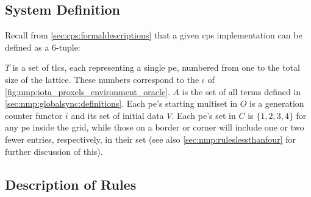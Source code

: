 \subsection{System Definition}
Recall from \cref{sec:cps:formaldescriptions} that a given \gls{cps} implementation can be defined as a 6-tuple:


\(T\) is a set of \glspl{tlc}, each representing a single \gls{pe}, numbered from one to the total size of the lattice.  These numbers correspond to the \(\iota\) of \cref{fig:nmp:iota_proxels_environment_oracle}.  \(A\) is the set of all terms defined in \cref{sec:nmp:globalsync:definitions}.  Each \gls{pe}'s starting multiset in \(O\) is a generation counter functor \(i\) and its set of initial data \(V\).  Each \gls{pe}'s set in \(C\) is \(\{1, 2, 3, 4\}\) for any \gls{pe} inside the grid, while those on a border or corner will include one or two fewer entries, respectively, in their set (see also \cref{sec:nmp:ruleslessthanfour} for further discussion of this).

\subsection{\label{sec:nmp:globalsync:rulesdesc}Description of Rules}

